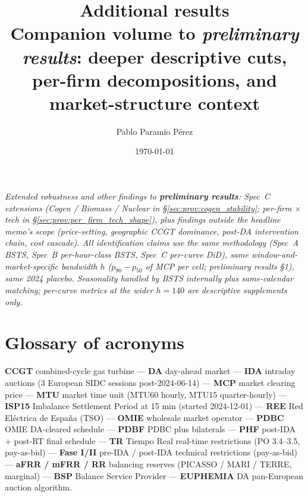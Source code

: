 \documentclass[11pt,a4paper]{article}
\title{Additional results\\[3pt]\large Companion volume to \emph{preliminary results}: deeper descriptive cuts, per-firm decompositions, and market-structure context}
\author{Pablo Paramio P\'erez}
\date{\today}
\begin{document}
\maketitle

\noindent\emph{Extended robustness and other findings to \textbf{preliminary results}: Spec~C extensions (Cogen / Biomass / Nuclear in \S\ref{sec:prov:cogen_stability}; per-firm $\times$ tech in \S\ref{sec:prov:per_firm_tech_shape}), plus findings outside the headline memo's scope (price-setting, geographic CCGT dominance, post-DA intervention chain, cost cascade). All identification claims use the same methodology (Spec~A BSTS, Spec~B per-hour-class BSTS, Spec~C per-curve DiD), same window-and-market-specific bandwidth $h$ ($p_{90}-p_{50}$ of MCP per cell; \emph{preliminary results} \S 1), same 2024 placebo. Seasonality handled by BSTS internally plus same-calendar matching; per-curve metrics at the wider $h = 140$ are descriptive supplements only.}


\tableofcontents

\bigskip

\section*{Glossary of acronyms}\label{sec:bid_internal:glossary}

\noindent\footnotesize
\textbf{CCGT} combined-cycle gas turbine ---
\textbf{DA} day-ahead market ---
\textbf{IDA} intraday auctions (3 European SIDC sessions post-2024-06-14) ---
\textbf{MCP} market clearing price ---
\textbf{MTU} market time unit (MTU60 hourly, MTU15 quarter-hourly) ---
\textbf{ISP15} Imbalance Settlement Period at 15 min (started 2024-12-01) ---
\textbf{REE} Red Eléctrica de España (TSO) ---
\textbf{OMIE} wholesale market operator ---
\textbf{PDBC} OMIE DA-cleared schedule ---
\textbf{PDBF} PDBC plus bilaterals ---
\textbf{PHF} post-IDA + post-RT final schedule ---
\textbf{TR} Tiempo Real real-time restrictions (PO 3.4--3.5, pay-as-bid) ---
\textbf{Fase I/II} pre-IDA / post-IDA technical restrictions (pay-as-bid) ---
\textbf{aFRR / mFRR / RR} balancing reserves (PICASSO / MARI / TERRE, marginal) ---
\textbf{BSP} Balance Service Provider ---
\textbf{EUPHEMIA} DA pan-European auction algorithm.\normalsize

\bigskip
\end{document}
